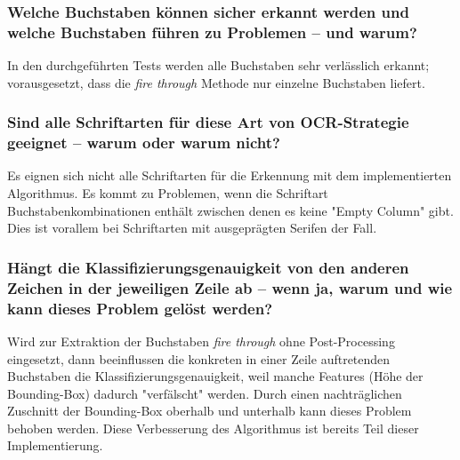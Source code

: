 \documentclass[german,notitlepage,smartquotes]{hgbreport}
\begin{document}
\subsubsection{Welche Buchstaben können sicher erkannt werden und welche Buchstaben führen zu Problemen -- und warum?}

In den durchgeführten Tests werden alle Buchstaben sehr verlässlich erkannt; vorausgesetzt, dass die \textit{fire through} Methode nur einzelne Buchstaben liefert.

\subsubsection{Sind alle Schriftarten für diese Art von OCR-Strategie geeignet -- warum oder warum nicht?}

Es eignen sich nicht alle Schriftarten für die Erkennung mit dem implementierten Algorithmus. Es kommt zu Problemen, wenn die Schriftart Buchstabenkombinationen enthält zwischen denen es keine "Empty Column" gibt. Dies ist vorallem bei Schriftarten mit ausgeprägten Serifen der Fall.

\subsubsection{Hängt die Klassifizierungsgenauigkeit von den anderen Zeichen in der jeweiligen Zeile ab -- wenn ja, warum und wie kann dieses Problem gelöst werden?}

Wird zur Extraktion der Buchstaben \textit{fire through} ohne Post-Processing eingesetzt, dann beeinflussen die konkreten in einer Zeile auftretenden Buchstaben die Klassifizierungsgenauigkeit, weil manche Features (\zB Höhe der Bounding-Box) dadurch "verfälscht" werden.
Durch einen nachträglichen Zuschnitt der Bounding-Box oberhalb und unterhalb kann dieses Problem behoben werden. Diese Verbesserung des Algorithmus ist bereits Teil dieser Implementierung.








\end{document}
